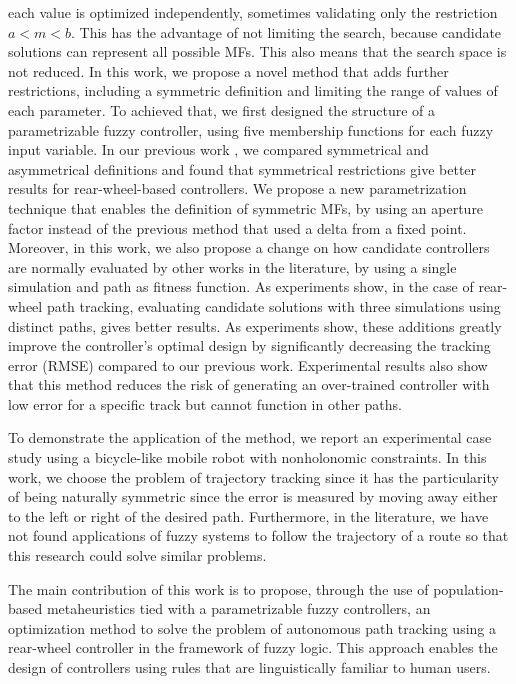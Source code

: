 \documentclass[symmetry,article,submit,moreauthors,pdftex]{Definitions/mdpi}
\begin{document}
each value is optimized independently, sometimes validating only the
restriction $a < m <b$. This has the advantage of not limiting the 
search, because candidate solutions can represent all possible MFs. This 
also means that the search space is not reduced.   
In this work, we propose a novel method that adds further restrictions,
including a symmetric definition and limiting the range of values of each
parameter. To achieved that, we first designed the structure of a parametrizable 
fuzzy controller, using five membership functions for each fuzzy input variable.
In our previous work \cite{mancilla2022tracking,Mancilla2021}, we
compared symmetrical and asymmetrical definitions and found that symmetrical
restrictions give better results for rear-wheel-based controllers. We propose a
new parametrization technique that enables the definition of symmetric MFs, by
using an aperture factor instead of the previous method that used a delta from
a fixed point.  Moreover, in this work, we also propose a change on how
candidate controllers are normally evaluated by other works in the literature,
by using a single simulation and path as fitness function. As experiments show,
in the case of rear-wheel path tracking, evaluating candidate solutions with
three simulations using distinct paths, gives better results.  As experiments
show, these additions greatly improve the controller's optimal design by
significantly decreasing the tracking error (RMSE) compared to our previous
work. Experimental results also show that this method reduces the risk of
generating an over-trained controller with low error for a specific track but
cannot function in other paths. 

To demonstrate the application of the method, we report an experimental case
study using a bicycle-like mobile robot with nonholonomic constraints.  In this
work, we choose the problem of trajectory tracking since it has the
particularity of being naturally symmetric since the error is measured by
moving away either to the left or right of the desired path. Furthermore, in
the literature, we have not found applications of fuzzy systems to follow the
trajectory of a route so that this research could solve similar problems.

The main contribution of this work is to propose, through the use of
population-based metaheuristics tied with a parametrizable fuzzy controllers,
an optimization method to solve the problem of autonomous path tracking using a
rear-wheel controller in the framework of fuzzy logic. This approach enables
the design of controllers using rules that are linguistically familiar to human
users.
\end{document}

